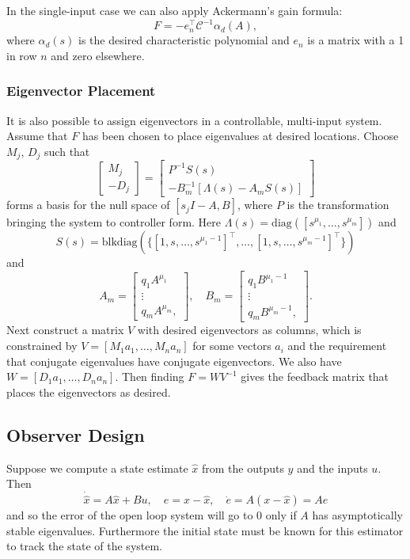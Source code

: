\documentclass{report}
\begin{document}
In the single-input case we can also apply Ackermann's gain formula:
$$
F = -e_n^\top \mathcal{C}^{-1} \alpha_d(A),
$$
where $\alpha_d(s)$ is the desired characteristic polynomial and
$e_n$ is a matrix with a 1 in row $n$ and zero elsewhere.

\subsubsection{Eigenvector Placement}
It is also possible to assign eigenvectors in a controllable,
multi-input system. Assume that $F$ has been
chosen to place eigenvalues at desired locations.
Choose $M_j$, $D_j$ such that
$$
\left[\begin{array}{r}
  M_j \\ -D_j
\end{array}\right] =
\left[\begin{array}{r}
   P^{-1} S(s) \\
  -B_m^{-1}[\Lambda(s) - A_m S(s)]
\end{array}\right]
$$
forms a basis for the null space of $[s_j I - A, B]$, where $P$ is the
transformation bringing the system to controller form. Here
$\Lambda(s) = \mathrm{diag}([s^{\mu_1}, \dots, s^{\mu_m}])$ and
$$
S(s) =
\mathrm{blk diag}(\{
  [1, s, \dots, s^{\mu_1 - 1}]^\top,
  \dots,
  [1, s, \dots, s^{\mu_m - 1}]^\top
\})
$$
and
$$
A_m =
\left[\begin{array}{c}
  q_1 A^{\mu_1} \\
  \vdots      \\
  q_m A^{\mu_m},
\end{array}\right], \quad
B_m =
\left[\begin{array}{c}
  q_1 B^{\mu_1 - 1} \\
  \vdots      \\
  q_m B^{\mu_m - 1},
\end{array}\right].
$$
Next construct a matrix $V$ with desired eigenvectors as columns,
which is constrained by $V = [M_1 a_1, \dots, M_n a_n]$ for some
vectors $a_i$ and the requirement that conjugate eigenvalues have
conjugate eigenvectors. We also have $W = [D_1 a_1, \dots, D_n a_n]$. Then
finding $F = WV^{-1}$ gives the feedback matrix that places the
eigenvectors as desired.

\subsection{Observer Design}
Suppose we compute a state estimate $\hat{x}$ from the outputs $y$ and
the inputs $u$. Then
$$
\dot{\hat{x}} = A\hat{x} + B u, \quad
e = x - \hat{x}, \quad
\dot{e} = A(x - \hat{x}) = Ae
$$
and so the error of the open loop system will go to 0 only if $A$ has
asymptotically stable eigenvalues. Furthermore the initial state must
be known for this estimator to track the state of the system.
\end{document}
